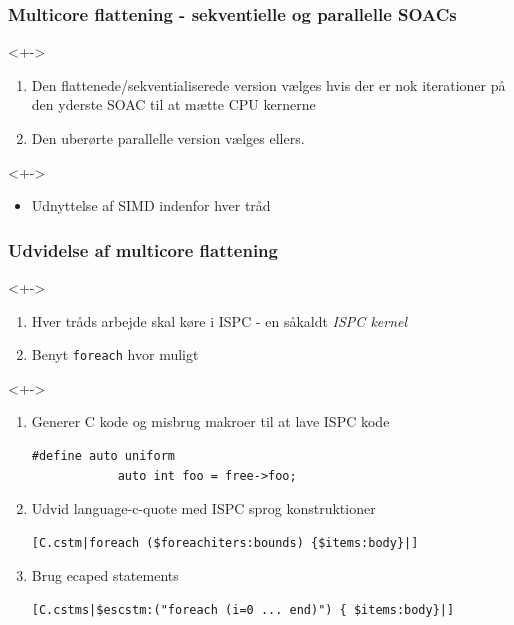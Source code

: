 \documentclass[t]{beamer}
\begin{document}
\begin{frame}
  \frametitle{Multicore flattening - sekventielle og parallelle SOACs}
  <+->
  \begin{enumerate}
    \item<+-> Den flattenede/sekventialiserede version vælges hvis der er nok iterationer på den yderste SOAC til at mætte CPU kernerne
    \item<+-> Den uberørte parallelle version vælges ellers.
  \end{enumerate}
  <+->
  \begin{itemize}
    \item<+-> Udnyttelse af SIMD indenfor hver tråd
  \end{itemize}
\end{frame}

\begin{frame}[fragile]
  \frametitle{Udvidelse af multicore flattening}
  <+->
  \begin{enumerate}
    \item<+-> Hver tråds arbejde skal køre i ISPC - en såkaldt \textit{ISPC kernel}
    \item<+-> Benyt \texttt{foreach} hvor muligt
  \end{enumerate}
  <+->
  \begin{enumerate}
    \item<+-> Generer C kode og misbrug makroer til at lave ISPC kode
\begin{lstlisting}[language=ispc, xleftmargin=-20mm]
            #define auto uniform
            auto int foo = free->foo;
          \end{lstlisting}
    \item<+-> Udvid language-c-quote med ISPC sprog konstruktioner
          \begin{lstlisting}[xleftmargin=-20mm]
            [C.cstm|foreach ($foreachiters:bounds) {$items:body}|]
          \end{lstlisting}
    \item<+-> Brug ecaped statements
          \begin{lstlisting}[xleftmargin=-20mm]
            [C.cstms|$escstm:("foreach (i=0 ... end)") { $items:body}|]
          \end{lstlisting}
  \end{enumerate}


\end{frame}
\end{document}
